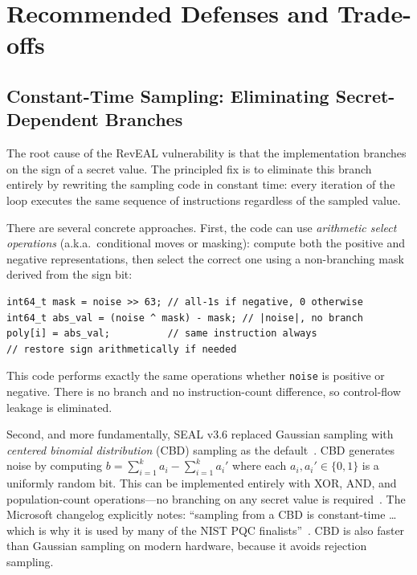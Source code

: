 \documentclass[sigconf,nonacm]{acmart}
\begin{document}
\section{Recommended Defenses and Trade-offs}
\label{sec:defenses}

\subsection{Constant-Time Sampling: Eliminating Secret-Dependent Branches}

The root cause of the RevEAL vulnerability is that the implementation branches on
the sign of a secret value. The principled fix is to eliminate this branch entirely
by rewriting the sampling code in constant time: every iteration of the loop executes
the same sequence of instructions regardless of the sampled value.

There are several concrete approaches. First, the code can use
\emph{arithmetic select operations} (a.k.a.\ conditional moves or masking): compute
both the positive and negative representations, then select the correct one using a
non-branching mask derived from the sign bit:

\begin{lstlisting}[label=lst:fixed, caption={Constant-time sign handling without branching.}]
int64_t mask = noise >> 63; // all-1s if negative, 0 otherwise
int64_t abs_val = (noise ^ mask) - mask; // |noise|, no branch
poly[i] = abs_val;          // same instruction always
// restore sign arithmetically if needed
\end{lstlisting}

This code performs exactly the same operations whether \texttt{noise} is positive or
negative. There is no branch and no instruction-count difference, so control-flow
leakage is eliminated.

Second, and more fundamentally, SEAL v3.6 replaced Gaussian sampling with
\emph{centered binomial distribution} (CBD) sampling as the default~\cite{sealchanges}.
CBD generates noise by computing $b = \sum_{i=1}^{k} a_i - \sum_{i=1}^{k} a_i'$
where each $a_i, a_i' \in \{0,1\}$ is a uniformly random bit. This can be implemented
entirely with XOR, AND, and population-count operations---no branching on any secret
value is required~\cite{sealchanges}. The Microsoft changelog explicitly notes: ``sampling
from a CBD is constant-time \ldots which is why it is used by many of the NIST PQC
finalists''~\cite{sealchanges}. CBD is also faster than Gaussian sampling on modern
hardware, because it avoids rejection sampling.
\end{document}
